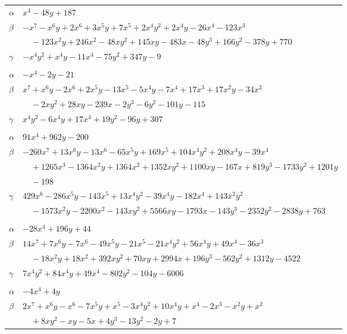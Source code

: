 \documentclass[11pt]{article}
\begin{document}
\begin{longtable}{@{}ll@{}}
$\alpha$ & $x^{4}-48y+187$\\
$\beta$ & $-x^{7}-x^{6}y+2x^{6}+3x^{5}y+7x^{5}+2x^{4}y^{2}+2x^{4}y-26x^{4}-123x^{3}$\\
 & $\quad -123x^{2}y+246x^{2}-48xy^{2}+145xy-483x-48y^{3}+166y^{2}-378y+770$\\
$\gamma$ & $-x^{4}y^{2}+x^{4}y-11x^{4}-75y^{2}+347y-9$\\
\addlinespace[3pt]
\multicolumn{2}{@{}l}{$\{i,j\}=\{15,39\}$, $k_{ij}=2\cdot 7^{2}$}\\
$\alpha$ & $-x^{4}-2y-21$\\
$\beta$ & $x^{7}+x^{6}y-2x^{6}+2x^{5}y-13x^{5}-5x^{4}y-7x^{4}+17x^{3}+17x^{2}y-34x^{2}$\\
 & $\quad -2xy^{2}+28xy-239x-2y^{3}-6y^{2}-101y-115$\\
$\gamma$ & $x^{4}y^{2}-6x^{4}y+17x^{4}+19y^{2}-96y+307$\\
\addlinespace[3pt]
\multicolumn{2}{@{}l}{$\{i,j\}=\{16,21\}$, $k_{ij}=2$}\\
$\alpha$ & $91x^{4}+962y-200$\\
$\beta$ & $-260x^{7}+13x^{6}y-13x^{6}-65x^{5}y+169x^{5}+104x^{4}y^{2}+208x^{4}y-39x^{4}$\\
 & $\quad +1265x^{3}-1364x^{2}y+1364x^{2}+1352xy^{2}+1100xy-167x+819y^{3}-1733y^{2}+1201y$\\
 & $\quad -198$\\
$\gamma$ & $429x^{6}-286x^{5}y-143x^{5}+13x^{4}y^{2}-39x^{4}y-182x^{4}+143x^{2}y^{2}$\\
 & $\quad -1573x^{2}y-2200x^{2}-143xy^{2}+5566xy-1793x-143y^{3}-2352y^{2}-2838y+763$\\
\addlinespace[3pt]
\multicolumn{2}{@{}l}{$\{i,j\}=\{16,26\}$, $k_{ij}=2^{5}\cdot 3^{2}\cdot 5$}\\
$\alpha$ & $-28x^{4}+196y+44$\\
$\beta$ & $14x^{7}+7x^{6}y-7x^{6}-49x^{5}y-21x^{5}-21x^{4}y^{2}+56x^{4}y+49x^{4}-36x^{3}$\\
 & $\quad -18x^{2}y+18x^{2}+392xy^{2}+70xy+2994x+196y^{3}-562y^{2}+1312y-4522$\\
$\gamma$ & $7x^{4}y^{2}+84x^{4}y+49x^{4}-802y^{2}-104y-6006$\\
\addlinespace[3pt]
\multicolumn{2}{@{}l}{$\{i,j\}=\{16,27\}$, $k_{ij}=2^{4}$}\\
$\alpha$ & $-4x^{4}+4y$\\
$\beta$ & $2x^{7}+x^{6}y-x^{6}-7x^{5}y+x^{5}-3x^{4}y^{2}+10x^{4}y+x^{4}-2x^{3}-x^{2}y+x^{2}$\\
 & $\quad +8xy^{2}-xy-5x+4y^{3}-13y^{2}-2y+7$\\

\end{longtable}
\end{document}
